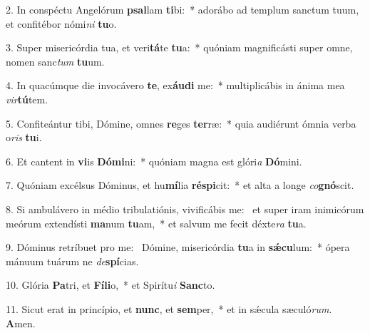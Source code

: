 2. In conspéctu Angelórum \textbf{psal}lam \textbf{ti}bi:~*  adorábo ad templum sanctum tuum, et confitébor nómi\textit{ni} \textbf{tu}o.\

3. Super misericórdia tua, et veri\textbf{tá}te \textbf{tu}a:~*  quóniam magnificásti super omne, nomen sanc\textit{tum} \textbf{tu}um.\

4. In quacúmque die invocávero \textbf{te}, ex\textbf{áu}\textbf{di} me:~*  multiplicábis in ánima mea \textit{vir}\textbf{tú}tem.\

5. Confiteántur tibi, Dómine, omnes \textbf{re}ges \textbf{ter}ræ:~*  quia audiérunt ómnia verba o\textit{ris} \textbf{tu}i.\

6. Et cantent in \textbf{vi}is \textbf{Dó}\textbf{mi}ni:~*  quóniam magna est glóri\textit{a} \textbf{Dó}mini.\

7. Quóniam excélsus Dóminus, et hu\textbf{mí}lia \textbf{ré}\textbf{spi}cit:~*  et alta a longe \textit{co}\textbf{gnó}scit.\

8. Si ambulávero in médio tribulatiónis, vivificábis me: \dag\  et super iram inimicórum meórum extendísti \textbf{ma}num \textbf{tu}am,~*  et salvum me fecit déxte\textit{ra} \textbf{tu}a.\

9. Dóminus retríbuet pro me: \dag\  Dómine, misericórdia \textbf{tu}a in \textbf{sǽ}\textbf{cu}lum:~*  ópera mánuum tuárum ne \textit{de}\textbf{spí}cias.\

10. Glória \textbf{Pa}tri, et \textbf{Fí}\textbf{li}o,~*  et Spirítu\textit{i} \textbf{Sanc}to.\

11. Sicut erat in princípio, et \textbf{nunc}, et \textbf{sem}per,~*  et in sǽcula sæculó\textit{rum}. \textbf{A}men.\

